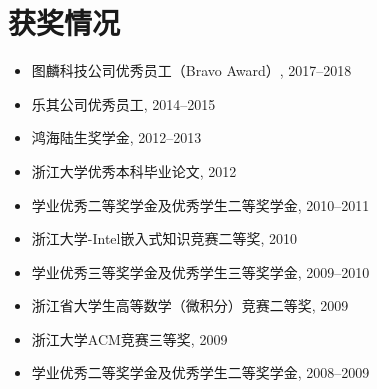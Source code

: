 \documentclass[letterpaper]{article}
\begin{document}




\section*{获奖情况}
\begin{itemize}
  \item 图麟科技公司优秀员工（Bravo Award）, 2017--2018
  \item 乐其公司优秀员工, 2014--2015
  \item 鸿海陆生奖学金, 2012--2013
  \item 浙江大学优秀本科毕业论文, 2012
  \item 学业优秀二等奖学金及优秀学生二等奖学金, 2010--2011
  \item 浙江大学-Intel嵌入式知识竞赛二等奖, 2010
  \item 学业优秀三等奖学金及优秀学生三等奖学金, 2009--2010
  \item 浙江省大学生高等数学（微积分）竞赛二等奖, 2009
  \item 浙江大学ACM竞赛三等奖, 2009
  \item 学业优秀二等奖学金及优秀学生二等奖学金, 2008--2009
\end{itemize}
\end{document}
